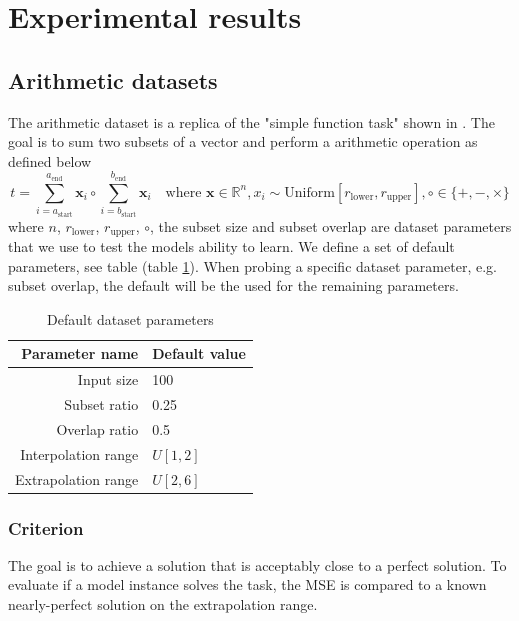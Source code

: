 \section{Experimental results}
\label{sec:experiments}

\subsection{Arithmetic datasets}

The arithmetic dataset is a replica of the "simple function task" shown in \cite{trask-nalu}.
The goal is to sum two subsets of a vector and perform a arithmetic operation as defined below
\begin{equation}
t = \sum_{i = a_{\mathrm{start}}}^{a_{\mathrm{end}}} \mathbf{x}_i \circ \sum_{i = b_{\mathrm{start}}}^{b_{\mathrm{end}}} \mathbf{x}_i \quad \text{where } \mathbf{x} \in \mathbb{R}^n, x_i \sim \mathrm{Uniform}[r_{\mathrm{lower}}, r_{\mathrm{upper}}], \circ \in \{+, -, \times\}
\label{eq:arithmetic-problem}
\end{equation}
where $n$, $r_{\mathrm{lower}}$, $r_{\mathrm{upper}}$, $\circ$, the subset size and subset overlap are dataset parameters that we use to test the models ability to learn.
We define a set of default parameters, see table (table \ref{tab:simple-function-task-defaults}).
When probing a specific dataset parameter, e.g. subset overlap, the default will be the used for the remaining parameters.

\begin{table}[H]
\caption{Default dataset parameters}
\label{tab:simple-function-task-defaults}
\centering
\begin{tabular}{r l}
\toprule
 Parameter name & Default value \\
 \midrule
 Input size & 100 \\
 Subset ratio & 0.25 \\
 Overlap ratio & 0.5 \\
 Interpolation range & $U[1,2]$ \\
 Extrapolation range & $U[2,6]$ \\
 \bottomrule
\end{tabular}
\end{table}

\subsubsection{Criterion}

The goal is to achieve a solution that is acceptably close to a perfect solution. To evaluate if a model instance solves the task, the MSE is compared to a known nearly-perfect solution on the extrapolation range.

